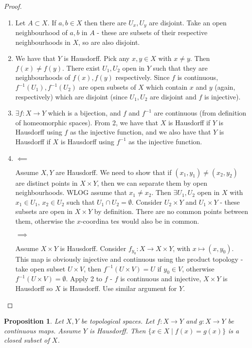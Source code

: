\documentclass{article}
\theoremstyle{definition}
\theoremstyle{plain}%
\newtheorem{prop}[thm]{Proposition}
\theoremstyle{remark}
\newcommand{\intersection}{\cap}
\begin{document}
\begin{proof}
    \hspace{0.1em}
    \begin{enumerate}
        \item Let $A \subset X$. If $a,b \in X$ then there are $U_x, U_y$ are disjoint. Take an open neighbourhood of $a,b$ in $A$ - these are subsets of their respective neighbourhoods in $X$, so are also disjoint.
        \item We have that $Y$ is Hausdorff. Pick any $x,y \in X$ with $x \ne y$. Then $f(x) \ne f(y)$. There exist $U_1, U_2$ open in $Y$ such that they are neighbourhoods of $f(x), f(y)$ respectively. Since $f$ is continuous, $f^{-1}(U_1), f^{-1}(U_2)$ are open subsets of $X$ which contain $x$ and $y$ (again, respectively) which are disjoint (since $U_1,U_2$ are disjoint and $f$ is injective).
        \item $\exists f : X \to Y$ which is a bijection, and $f$ and $f^{-1}$ are continuous (from definition of homeomorphic spaces). From 2, we have that $X$ is Hausdorff if $Y$ is Hausdorff using $f$ as the injective function, and we also have that $Y$ is Hausdorff if $X$ is Hausdorff using $f^{-1}$ as the injective function.
        \item
        $\impliedby$
        
        Assume $X,Y$ are Hausdorff. We need to show that if $(x_1,y_1) \ne (x_2, y_2)$ are distinct points in $X \times Y$, then we can separate them by open neighbourhoods. WLOG assume that $x_1 \ne x_2$. Then $\exists U_1, U_2$ open in $X$ with $x_1 \in U_1$, $x_2 \in U_2$ such that $U_1 \intersection U_2 = \emptyset$. Consider $U_2 \times Y$ and $U_1 \times Y$ - these subsets are open in $X \times Y$ by definition. There are no common points between them, otherwise the $x$-coordina tes would also be in common.
        
        $\implies$
        
        Assume $X \times Y$ is Hausdorff. Consider $f_{y_0}: X \to X \times Y$,  with $x \mapsto (x, y_0)$. This map is obviously injective and continuous using the product topology - take open subset $U \times V$, then $f^{-1}(U \times V) = U$ if $y_0 \in V$, otherwise $f^{-1}(U \times V) = \emptyset$. Apply 2 to $f$ - $f$ is continuous and injective, $X \times Y$ is Hausdorff so $X$ is Hausdorff. Use similar argument for $Y$.
    \end{enumerate}
\end{proof}

\begin{prop}\label{set of agreed points is closed}
    Let $X,Y$ be topological spaces. Let $f: X \to Y$ and $g: X \to Y$ be continuous maps. Assume $Y$ is Hausdorff. Then $\{x \in X \;|\; f(x) = g(x)\}$ is a closed subset of $X$.
\end{prop}
\end{document}
